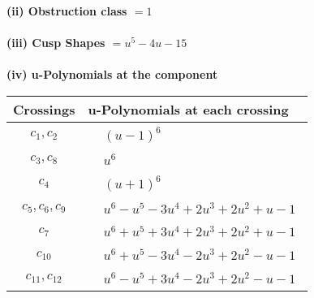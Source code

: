 \documentclass[1p]{elsarticle_modified}
\theoremstyle{definition}
\begin{document}
\flushleft \textbf{(ii) Obstruction class $= 1$}\\~\\
\flushleft \textbf{(iii) Cusp Shapes $= u^5-4 u-15$}\\~\\
\newpage\renewcommand{\arraystretch}{1}
\flushleft \textbf{(iv) u-Polynomials at the component}\newline \\
\begin{tabular}{m{50pt}|m{274pt}}
Crossings & \hspace{64pt}u-Polynomials at each crossing \\
\hline $$\begin{aligned}c_{1},c_{2}\end{aligned}$$&$\begin{aligned}
&(u-1)^6
\end{aligned}$\\
\hline $$\begin{aligned}c_{3},c_{8}\end{aligned}$$&$\begin{aligned}
&u^6
\end{aligned}$\\
\hline $$\begin{aligned}c_{4}\end{aligned}$$&$\begin{aligned}
&(u+1)^6
\end{aligned}$\\
\hline $$\begin{aligned}c_{5},c_{6},c_{9}\end{aligned}$$&$\begin{aligned}
&u^6- u^5-3 u^4+2 u^3+2 u^2+u-1
\end{aligned}$\\
\hline $$\begin{aligned}c_{7}\end{aligned}$$&$\begin{aligned}
&u^6+u^5+3 u^4+2 u^3+2 u^2+u-1
\end{aligned}$\\
\hline $$\begin{aligned}c_{10}\end{aligned}$$&$\begin{aligned}
&u^6+u^5-3 u^4-2 u^3+2 u^2- u-1
\end{aligned}$\\
\hline $$\begin{aligned}c_{11},c_{12}\end{aligned}$$&$\begin{aligned}
&u^6- u^5+3 u^4-2 u^3+2 u^2- u-1
\end{aligned}$\\
\hline
\end{tabular}\\~\\
\end{document}
